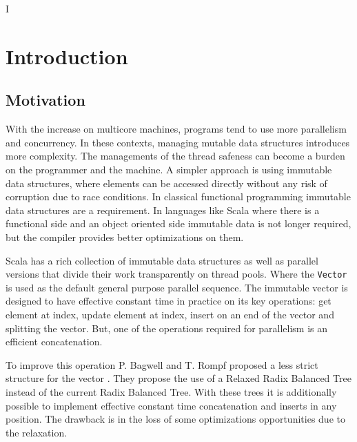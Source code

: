 I%
\lhead{} 

\chapter{Introduction} %
\label{Introduction} %



\section{Motivation}
With the increase on multicore machines, programs tend to use more parallelism and concurrency. In these contexts, managing mutable data structures introduces more complexity. The managements of the thread safeness can become a burden on the programmer and the machine. A simpler approach is using immutable data structures, where elements can be accessed directly without any risk of corruption due to race conditions. In classical functional programming immutable data structures are a requirement. In languages like Scala where there is a functional side and an object oriented side immutable data is not longer required, but the compiler provides better optimizations on them.

Scala has a rich collection of immutable data structures as well as parallel versions that divide their work transparently on thread pools. Where the \texttt{Vector} is used as the default general purpose parallel sequence. The immutable vector is designed to have effective constant time in practice on its key operations: get element at index, update element at index, insert on an end of the vector and splitting the vector. But, one of the operations required for parallelism is an efficient concatenation.

To improve this operation P. Bagwell and T. Rompf proposed a less strict structure for the vector \cite{RRBTrees}. They propose the use of a Relaxed Radix Balanced Tree instead of the current Radix Balanced Tree. With these trees it is additionally possible to implement effective constant time concatenation and inserts in any position. The drawback is in the loss of some optimizations opportunities due to the relaxation.

